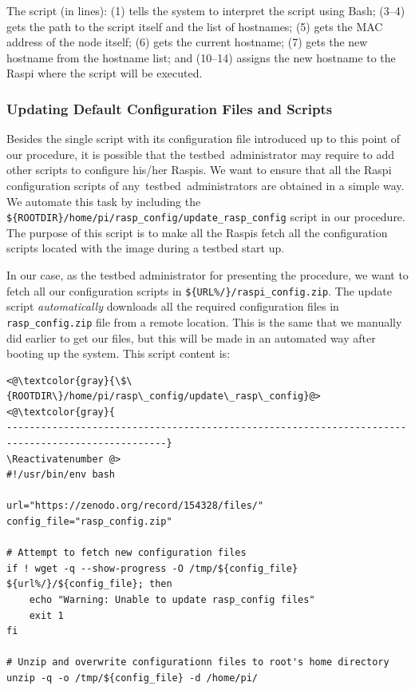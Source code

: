 \documentclass[electronics,article,accept,moreauthors,pdftex,10pt,a4paper]{mdpi}
\theoremstyle{mdpi}
\newcounter{ex}
\newcounter{re}
\theoremstyle{mdpidefinition}
\begin{document}
The script (in lines): (1) tells the system to interpret the script
using \ac{Bash}; (3--4) gets the path to the script itself and the list of
hostnames; (5) gets the MAC address of the node itself; (6) gets the
current hostname; (7) gets the new hostname from the hostname list; and
(10--14) assigns the new hostname to the Raspi where the script
will be executed.

\subsubsection{Updating Default Configuration Files and Scripts}

Besides the single script with its configuration file introduced up
to this point of our procedure, it is possible that the testbed~administrator may require to add other scripts to configure
his/her Raspis. We want
to ensure that all the Raspi configuration scripts of any~testbed~administrators are obtained in a simple way. We automate this task by
including the \texttt{\$\{ROOTDIR\}/home/pi/rasp\_config/update\_rasp\_config}
script in our procedure. The purpose of this script is to make all the
Raspis fetch all the configuration scripts located with the image
during a testbed start up.

In our case, as the testbed administrator for presenting the procedure, we want
to fetch all our configuration scripts in
\texttt{\$\{URL\%/\}/raspi\_config.zip}. The update script
\textit{automatically} downloads all the required configuration files in
\texttt{rasp\_config.zip} file from a remote location. This is the same that
we manually did earlier to get our files, but this will be made in an
automated way after booting up the system. This script content is:

\Suppressnumber\begin{lstlisting}[]
<@\textcolor{gray}{\$\{ROOTDIR\}/home/pi/rasp\_config/update\_rasp\_config}@>
<@\textcolor{gray}{
--------------------------------------------------------------------------------------------------}
\Reactivatenumber @>
#!/usr/bin/env bash

url="https://zenodo.org/record/154328/files/"
config_file="rasp_config.zip"

# Attempt to fetch new configuration files
if ! wget -q --show-progress -O /tmp/${config_file} ${url%/}/${config_file}; then
    echo "Warning: Unable to update rasp_config files"
    exit 1
fi

# Unzip and overwrite configurationn files to root's home directory
unzip -q -o /tmp/${config_file} -d /home/pi/
\end{lstlisting}
\FloatBarrier
\vspace{-5mm}
\end{document}
